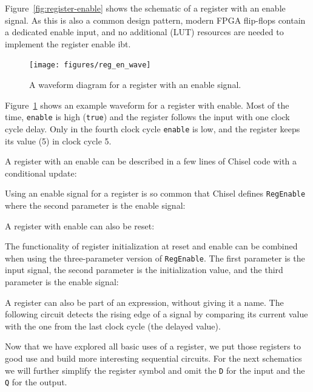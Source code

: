 \documentclass[%
    10pt,
    headinclude, footexclude,
    openright, %
    notitlepage,
    cleardoubleempty,
    headsepline,
    pointlessnumbers,
    bibtotoc, idxtotoc,
    ]{scrbook}
\newcommand{\code}[1]{{\small{\texttt{#1}}}}
\begin{document}
Figure~\ref{fig:register-enable} shows the schematic of a register with an enable signal.
As this is also a common design pattern, modern FPGA flip-flops contain a
dedicated enable input, and no additional (LUT) resources are needed to implement
the register enable ibt.

\begin{figure}
  \centering
  \texttt{[image: figures/reg\_en\_wave]}
  \caption{A waveform diagram for a register with an enable signal.}
  \label{fig:register-en-wave}
\end{figure}

Figure~\ref{fig:register-en-wave} shows an example waveform for a register
with enable. Most of the time, \code{enable} is high (\code{true}) and the register
follows the input with one clock cycle delay. Only in the fourth clock cycle
\code{enable} is low, and the register keeps its value (5) in clock cycle 5.

A register with an enable can be described in a few lines of Chisel code
with a conditional update:


\noindent Using an enable signal for a register is so common that Chisel defines
\code{RegEnable} where the second parameter is the enable signal:


\noindent A register with enable can also be reset:


\noindent The functionality of register initialization at reset and enable can be combined when
using the three-parameter version of \code{RegEnable}. The first parameter is the input signal,
the second parameter is the initialization value, and the third parameter is the enable signal:




A register can also be part of an expression, without giving it a name.
The following circuit detects the rising edge of a signal by comparing its current
value with the one from the last clock cycle (the delayed value).


Now that we have explored all basic uses of a register, we put those registers to
good use and build more interesting sequential circuits. For the next schematics we
will further simplify the register symbol and omit the \code{D} for the input and the
\code{Q} for the output.
\end{document}
